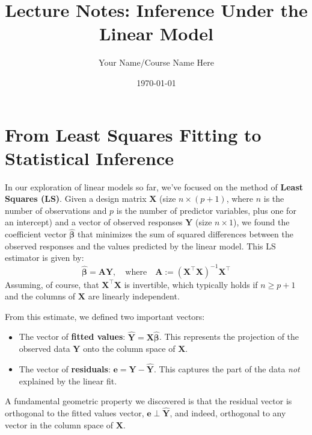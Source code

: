 \documentclass[11pt, letterpaper]{article}
\theoremstyle{definition}
\theoremstyle{plain} %
\theoremstyle{remark}
\newcommand{\vb}[1]{\bm{#1}}          %
\newcommand{\mb}[1]{\bm{#1}}          %
\newcommand{\Yvec}{\vb{Y}}            %
\newcommand{\Xmat}{\mb{X}}            %
\newcommand{\Amat}{\mb{A}}            %
\newcommand{\evec}{\vb{e}}            %
\newcommand{\Yhatvec}{\vb{\hat{Y}}}    %
\newcommand{\betahatvec}{\vb{\hat{\beta}}}%
\begin{document}
\title{Lecture Notes: Inference Under the Linear Model}
\author{Your Name/Course Name Here} %
\date{\today} %

\maketitle


\section{From Least Squares Fitting to Statistical Inference}

In our exploration of linear models so far, we've focused on the method of \textbf{Least Squares (LS)}. Given a design matrix $\Xmat$ (size $n \times (p+1)$, where $n$ is the number of observations and $p$ is the number of predictor variables, plus one for an intercept) and a vector of observed responses $\Yvec$ (size $n \times 1$), we found the coefficient vector $\betahatvec$ that minimizes the sum of squared differences between the observed responses and the values predicted by the linear model. This LS estimator is given by:
\[
\betahatvec = \Amat \Yvec, \quad \text{where} \quad \Amat := (\Xmat^\top \Xmat)^{-1} \Xmat^\top
\]
Assuming, of course, that $\Xmat^\top \Xmat$ is invertible, which typically holds if $n \ge p+1$ and the columns of $\Xmat$ are linearly independent.

From this estimate, we defined two important vectors:
\begin{itemize}
    \item The vector of \textbf{fitted values}: $\Yhatvec = \Xmat \betahatvec$. This represents the projection of the observed data $\Yvec$ onto the column space of $\Xmat$.
    \item The vector of \textbf{residuals}: $\evec = \Yvec - \Yhatvec$. This captures the part of the data \emph{not} explained by the linear fit.
\end{itemize}
A fundamental geometric property we discovered is that the residual vector is orthogonal to the fitted values vector, $\evec \perp \Yhatvec$, and indeed, orthogonal to any vector in the column space of $\Xmat$.
\end{document}
